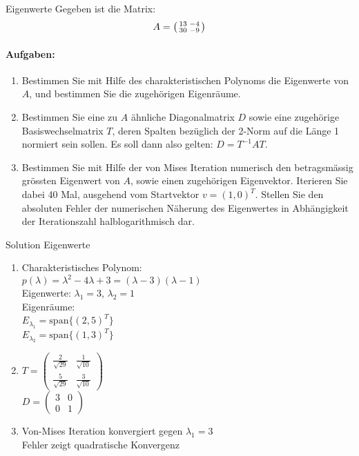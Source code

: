 \begin{example2}{Eigenwerte}
Gegeben ist die Matrix:
$$A = \begin{psmallmatrix}
13 & -4\\
30 & -9
\end{psmallmatrix}$$

\paragraph{Aufgaben:}
\begin{enumerate}
    \item Bestimmen Sie mit Hilfe des charakteristischen Polynoms die Eigenwerte von $A$, und bestimmen Sie die zugehörigen Eigenräume.
    
    \item Bestimmen Sie eine zu $A$ ähnliche Diagonalmatrix $D$ sowie eine zugehörige Basiswechselmatrix $T$, deren Spalten bezüglich der 2-Norm auf die Länge 1 normiert sein sollen. Es soll dann also gelten: $D = T^{-1}AT$.
    
    \item Bestimmen Sie mit Hilfe der von Mises Iteration numerisch den betragsmässig grössten Eigenwert von $A$, sowie einen zugehörigen Eigenvektor. Iterieren Sie dabei 40 Mal, ausgehend vom Startvektor $v = (1,0)^T$. Stellen Sie den absoluten Fehler der numerischen Näherung des Eigenwertes in Abhängigkeit der Iterationszahl halblogarithmisch dar.
\end{enumerate}
\end{example2}

\begin{KR}{Solution Eigenwerte}
\begin{enumerate}
    \item Charakteristisches Polynom:\\
    $p(\lambda) = \lambda^2 - 4\lambda + 3 = (\lambda-3)(\lambda-1)$\\
    Eigenwerte: $\lambda_1 = 3$, $\lambda_2 = 1$\\
    Eigenräume:\\
    $E_{\lambda_1} = \text{span}\{(2,5)^T\}$\\
    $E_{\lambda_2} = \text{span}\{(1,3)^T\}$
    
    \item $T = \begin{pmatrix}
    \frac{2}{\sqrt{29}} & \frac{1}{\sqrt{10}}\\
    \frac{5}{\sqrt{29}} & \frac{3}{\sqrt{10}}
    \end{pmatrix}$\\
    $D = \begin{pmatrix}
    3 & 0\\
    0 & 1
    \end{pmatrix}$
    
    \item Von-Mises Iteration konvergiert gegen $\lambda_1 = 3$\\
    Fehler zeigt quadratische Konvergenz
\end{enumerate}
\end{KR}


